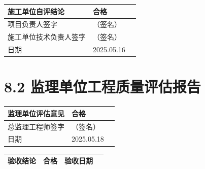 \documentclass[UTF8,10pt,a4paper,fontset=fandol]{ctexart}
\newcommand{\fieldvalue}[1]{#1}
\newcommand{\handwritten}[1]{#1}
\begin{document}
\vspace{0.5em}

\begin{tabularx}{\textwidth}{|>{\RaggedRight\arraybackslash}p{}|>{\RaggedRight\arraybackslash}p{}|X|}
\hline
施工单位自评结论 & 
\fieldvalue{\handwritten{合格}} & \\ \hline
项目负责人签字 & 
\fieldvalue{\handwritten{（签名）}} & \\ \hline
施工单位技术负责人签字 & 
\fieldvalue{\handwritten{（签名）}} & \\ \hline
日期 & 
\fieldvalue{\handwritten{2025.05.16}} & \\ \hline
\end{tabularx}

\vspace{1em}

\section{8.2 监理单位工程质量评估报告}

\begin{tabularx}{\textwidth}{|>{\RaggedRight\arraybackslash}p{}|>{\RaggedRight\arraybackslash}p{}|X|}
\hline
监理单位评估意见 & 
\fieldvalue{\handwritten{合格}} & \\ \hline
总监理工程师签字 & 
\fieldvalue{\handwritten{（签名）}} & \\ \hline
日期 & 
\fieldvalue{\handwritten{2025.05.18}} & \\ \hline
\end{tabularx}

\vspace{1em}

\begin{tabularx}{\textwidth}{|>{\RaggedRight\arraybackslash}p{}|X|>{\RaggedRight\arraybackslash}p{}|X|}
\hline
验收结论 & 
\fieldvalue{\handwritten{合格}} &
验收日期 & \\ \hline
\end{tabularx}
\end{document}
